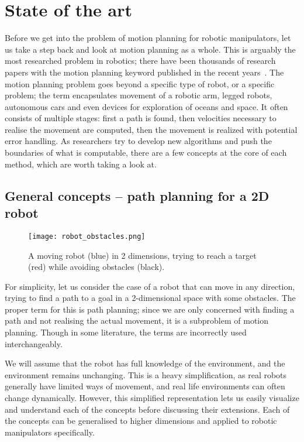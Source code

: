 \chapter{State of the art}\label{SotA}

Before we get into the problem of motion planning for robotic manipulators, let us take a step back and look at motion planning as a whole. This is arguably the most researched problem in robotics; there have been thousands of research papers with the motion planning keyword published in the recent years~\cite{RASreview}. The motion planning problem goes beyond a specific type of robot, or a specific problem; the term encapsulates movement of a robotic arm, legged robots, autonomous cars and even devices for exploration of oceans and space. It often consists of multiple stages: first a path is found, then velocities necessary to realise the movement are computed, then the movement is realized with potential error handling.
As researchers try to develop new algorithms and push the boundaries of what is computable, there are a few concepts at the core of each method, which are worth taking a look at.

\section{General concepts -- path planning for a 2D robot}

\begin{figure}[ht]
    \centering
    \texttt{[image: robot\_obstacles.png]}
  \caption{A moving robot (blue) in 2 dimensions, trying to reach a target (red) while avoiding obstacles (black).}\label{fig:bot}
\end{figure}

For simplicity, let us consider the case of a robot that can move in any direction, trying to find a path to a goal in a 2-dimensional space with some obstacles. The proper term for this is path planning; since we are only concerned with finding a path and not realising the actual movement, it is a subproblem of motion planning. Though in some literature, the terms are incorrectly used interchangeably.

We will assume that the robot has full knowledge of the environment, and the environment remains unchanging. This is a heavy simplification, as real robots generally have limited ways of movement, and real life environments can often change dynamically. However, this simplified representation lets us easily visualize and understand each of the concepts before discussing their extensions. Each of the concepts can be generalised to higher dimensions and applied to robotic manipulators specifically.

